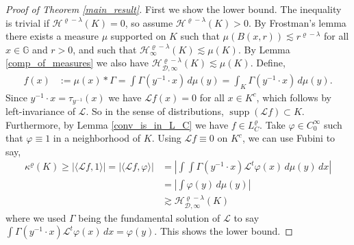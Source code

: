 \documentclass[12pt,a4paper,reqno]{amsart}
\DeclareMathOperator{\supp}{supp}
\newcommand{\cg}{\Gamma}
\renewcommand{\L}{\mathcal{L}}
\renewcommand{\k}{\kappa}
\renewcommand{\l}{\lambda}
\newcommand{\G}{\mathbb{G}}
\numberwithin{equation}{section}
\theoremstyle{definition}
\begin{document}
\begin{proof}[Proof of Theorem \ref{main_result}]
 First we show the lower bound. The inequality is trivial if $\mathcal{H}^{\varrho - \l}(K) = 0$, so assume $\mathcal{H}^{\varrho - \l}(K) > 0$. By Frostman's lemma there exists a measure $\mu$ supported on $K$ such that $\mu(B(x,r)) \lesssim r^{\varrho - \l}$ for all $x \in \G$ and $r > 0$, and such that $\mathcal{H}_{\infty}^{\varrho - \l}(K) \lesssim \mu(K)$. By Lemma \ref{comp_of_measures} we also have $\mathcal{H}_{\mathcal{D},\infty}^{\varrho-\l}(K) \lesssim \mu(K)$. Define,  
 \begin{align*}
 f(x) &:=  \mu(x) \ast \cg = \int \cg( y^{-1} \cdot x) \, d\mu(y) = \int_K \cg(y^{-1} \cdot x) \, d\mu(y).
 \end{align*} 
 Since $y^{-1} \cdot x = \tau_{y^{-1}} (x)$ we have $\L f(x) = 0$ for all $x \in K^c$, which follows by left-invariance of $\L$. So in the sense of distributions, $\supp (\L f) \subset K$. Furthermore, by Lemma \ref{conv_is_in_L_C} we have $f \in L_C^{\varrho}$. Take $\varphi \in C_0^{\infty}$ such that $\varphi \equiv 1$ in a neighborhood of $K$. Using $\L f \equiv 0$ on $K^c$, we can use Fubini to say, \begin{align}
    \k^{\varrho}(K) \geq  \left| \langle \L f, 1 \rangle \right|= | \langle \L f, \varphi \rangle | &= \left| \int \int \cg(y^{-1} \cdot x)\L^t\varphi(x) \, d\mu(y) \,dx \right| \nonumber \\ &= \left| \int \varphi(y) \,d\mu(y) \right| \nonumber \\ &\gtrsim \mathcal{H}_{\mathcal{D},\infty}^{\varrho -\l}(K) \nonumber
\end{align}
where we used $\cg$ being the fundamental solution of $\L$ to say $\int \cg(y^{-1}\cdot x)\L^t \varphi(x)\,dx = \varphi(y)$. This shows the lower bound. 


\end{proof}
\end{document}
